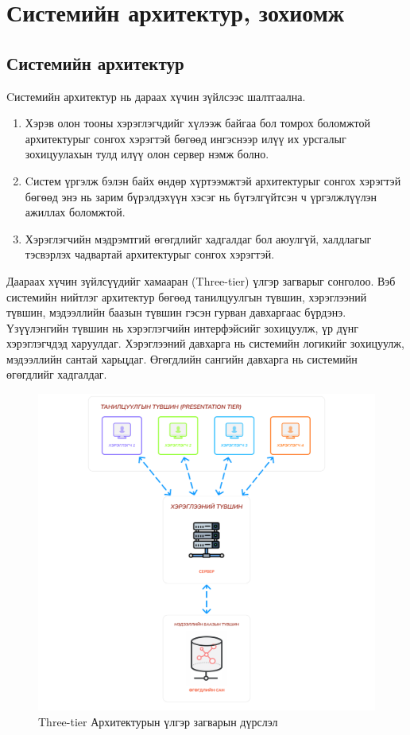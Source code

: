 \chapter{Системийн архитектур, зохиомж}

\section{Системийн архитектур}

Cистемийн архитектур нь дараах хүчин зүйлсээс шалтгаална.

\begin{enumerate}
	\item Хэрэв олон тооны хэрэглэгчдийг хүлээж байгаа бол томрох боломжтой архитектурыг сонгох хэрэгтэй бөгөөд ингэснээр илүү их урсгалыг зохицуулахын тулд илүү олон сервер нэмж болно.
	\item Cистем үргэлж бэлэн байх өндөр хүртээмжтэй архитектурыг сонгох хэрэгтэй бөгөөд энэ нь зарим бүрэлдэхүүн хэсэг нь бүтэлгүйтсэн ч үргэлжлүүлэн ажиллах боломжтой.
	\item Хэрэглэгчийн мэдрэмтгий өгөгдлийг хадгалдаг бол аюулгүй, халдлагыг тэсвэрлэх чадвартай архитектурыг сонгох хэрэгтэй.
\end{enumerate}

Даараах хүчин зүйлсүүдийг хамааран (Three-tier) үлгэр загварыг сонголоо. Вэб системийн нийтлэг архитектур бөгөөд танилцуулгын түвшин, хэрэглээний түвшин, мэдээллийн баазын түвшин гэсэн гурван давхаргаас бүрдэнэ. Үзүүлэнгийн түвшин нь хэрэглэгчийн интерфэйсийг зохицуулж, үр дүнг хэрэглэгчдэд харуулдаг. Хэрэглээний давхарга нь системийн логикийг зохицуулж, мэдээллийн сантай харьцдаг. Өгөгдлийн сангийн давхарга нь системийн өгөгдлийг хадгалдаг.

\begin{figure}[h]
	\centering
	\includegraphics[width=15cm]{images/architecture.png}
	\caption{Three-tier Архитектурын үлгэр загварын дүрслэл}
	\label{fig:architecture}
\end{figure}

